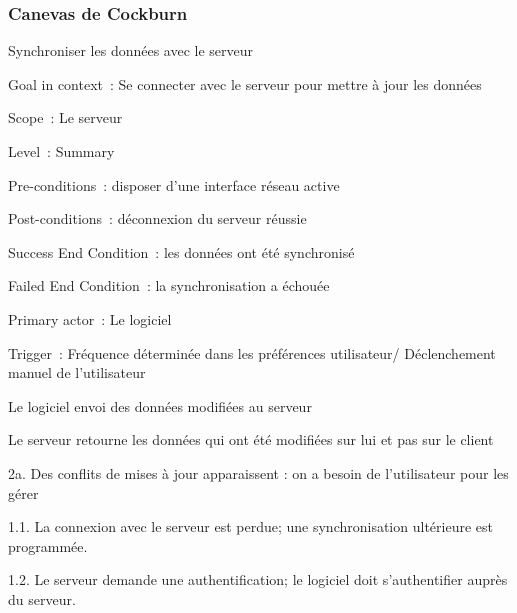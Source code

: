 \subsubsection{Canevas de Cockburn}

\begin{usecase}{Synchroniser les données avec le serveur}
\begin{information}
\item[Goal in context~:] Se connecter avec le serveur pour mettre à jour les données
\item[Scope~:] Le serveur
\item[Level~:] Summary
\item[Pre-conditions~:] disposer d'une interface réseau active
\item[Post-conditions~:] déconnexion du serveur réussie
\item[Success End Condition~:] les données ont été synchronisé
\item[Failed End Condition~:] la synchronisation a échouée
\item[Primary actor~:] Le logiciel
\item[Trigger~:] Fréquence déterminée dans les préférences utilisateur/ Déclenchement manuel de l'utilisateur
\\
\end{information}
\begin{scenario}
\item Le logiciel envoi des données modifiées au serveur
\item Le serveur retourne les données qui ont été modifiées sur lui et pas sur le client
\\
\end{scenario}

\begin{extension}
\item[2a.] Des conflits de mises à jour apparaissent : on a besoin de l'utilisateur pour les gérer
\\
\end{extension}

\begin{variation}
\item[1.1.] La connexion avec le serveur est perdue; une synchronisation ultérieure est programmée.
\item[1.2.] Le serveur demande une authentification; le logiciel doit s'authentifier auprès du serveur.
\\
\end{variation}


\end{usecase}
